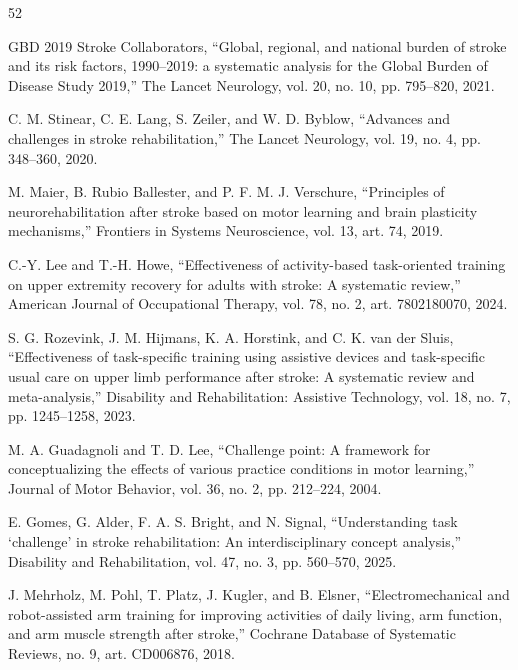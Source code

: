 \documentclass[journal,twoside,web]{ieeecolor2}
\begin{document}
\begin{thebibliography}{52}

\label{bib:b1} GBD 2019 Stroke Collaborators, ``Global, regional, and national burden of stroke and its risk factors, 1990--2019: a systematic analysis for the Global Burden of Disease Study 2019,'' The Lancet Neurology, vol. 20, no. 10, pp. 795--820, 2021.

\label{bib:b2} C. M. Stinear, C. E. Lang, S. Zeiler, and W. D. Byblow, ``Advances and challenges in stroke rehabilitation,'' The Lancet Neurology, vol. 19, no. 4, pp. 348--360, 2020.

\label{bib:b3} M. Maier, B. Rubio Ballester, and P. F. M. J. Verschure, ``Principles of neurorehabilitation after stroke based on motor learning and brain plasticity mechanisms,'' Frontiers in Systems Neuroscience, vol. 13, art. 74, 2019.

\label{bib:b4} C.-Y. Lee and T.-H. Howe, ``Effectiveness of activity-based task-oriented training on upper extremity recovery for adults with stroke: A systematic review,'' American Journal of Occupational Therapy, vol. 78, no. 2, art. 7802180070, 2024.

\label{bib:b5} S. G. Rozevink, J. M. Hijmans, K. A. Horstink, and C. K. van der Sluis, ``Effectiveness of task-specific training using assistive devices and task-specific usual care on upper limb performance after stroke: A systematic review and meta-analysis,'' Disability and Rehabilitation: Assistive Technology, vol. 18, no. 7, pp. 1245--1258, 2023.

\label{bib:b6} M. A. Guadagnoli and T. D. Lee, ``Challenge point: A framework for conceptualizing the effects of various practice conditions in motor learning,'' Journal of Motor Behavior, vol. 36, no. 2, pp. 212--224, 2004.

\label{bib:b7} E. Gomes, G. Alder, F. A. S. Bright, and N. Signal, ``Understanding task `challenge' in stroke rehabilitation: An interdisciplinary concept analysis,'' Disability and Rehabilitation, vol. 47, no. 3, pp. 560--570, 2025.

\label{bib:b8} J. Mehrholz, M. Pohl, T. Platz, J. Kugler, and B. Elsner, ``Electromechanical and robot-assisted arm training for improving activities of daily living, arm function, and arm muscle strength after stroke,'' Cochrane Database of Systematic Reviews, no. 9, art. CD006876, 2018.


\end{thebibliography}
\end{document}
